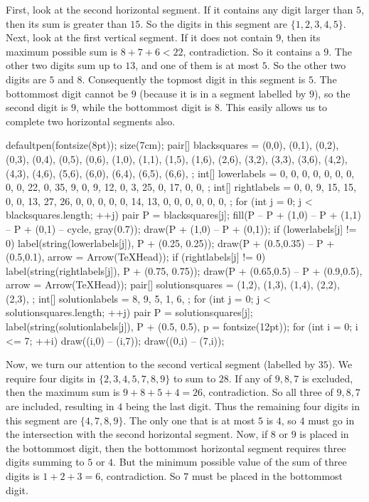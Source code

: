 First, look at the second horizontal segment. If it contains any digit larger than $5$, then its sum is greater than $15$. So the digits in this segment are $\{1,2,3,4,5\}$. Next, look at the first vertical segment. If it does not contain $9$, then its maximum possible sum is $8+7+6<22$, contradiction. So it contains a $9$. The other two digits sum up to $13$, and one of them is at most $5$. So the other two digits are $5$ and $8$. Consequently the topmost digit in this segment is $5$. The bottommost digit cannot be $9$ (because it is in a segment labelled by $9$), so the second digit is $9$, while the bottommost digit is $8$. This easily allows us to complete two horizontal segments also.
	\begin{center}
		\begin{asy}
			defaultpen(fontsize(8pt));
			size(7cm);
			pair[] blacksquares = {
				(0,0), (0,1), (0,2), (0,3), (0,4), (0,5), (0,6),
				(1,0), (1,1), (1,5), (1,6),
				(2,6),
				(3,2), (3,3), (3,6),
				(4,2), (4,3), (4,6),
				(5,6),
				(6,0), (6,4), (6,5), (6,6),
			};
			int[] lowerlabels = {
				0, 0, 0, 0, 0, 0, 0,
				0, 0, 22, 0,
				35,
				9, 0, 9,
				12, 0, 3,
				25,
				0, 17, 0, 0,
			};
			int[] rightlabels = {
				0, 0, 9, 15, 15, 0, 0,
				13, 27, 26, 0,
				0,
				0, 0, 0,
				14, 13, 0,
				0,
				0, 0, 0, 0,
			};
			for (int j = 0; j < blacksquares.length; ++j) {
				pair P = blacksquares[j];
				fill(P -- P + (1,0) -- P + (1,1) -- P + (0,1) -- cycle, gray(0.7));
				draw(P + (1,0) -- P + (0,1));
				if (lowerlabels[j] != 0) {
					label(string(lowerlabels[j]), P + (0.25, 0.25));
					draw(P + (0.5,0.35) -- P + (0.5,0.1), arrow = Arrow(TeXHead));
				}
				if (rightlabels[j] != 0) {
					label(string(rightlabels[j]), P + (0.75, 0.75));
					draw(P + (0.65,0.5) -- P + (0.9,0.5), arrow = Arrow(TeXHead));
				}
			}
			pair[] solutionsquares = {
				(1,2), (1,3), (1,4),
				(2,2), (2,3),
			};
			int[] solutionlabels = {
				8, 9, 5,
				1, 6,
			};
			for (int j = 0; j < solutionsquares.length; ++j) {
				pair P = solutionsquares[j];
				label(string(solutionlabels[j]), P + (0.5, 0.5), p = fontsize(12pt));
			}
			for (int i = 0; i <= 7; ++i) {
				draw((i,0) -- (i,7));
				draw((0,i) -- (7,i));
			}
		\end{asy}
	\end{center}
	Now, we turn our attention to the second vertical segment (labelled by $35$). We require four digits in $\{2,3,4,5,7,8,9\}$ to sum to $28$. If any of $9,8,7$ is excluded, then the maximum sum is $9+8+5+4=26$, contradiction. So all three of $9,8,7$ are included, resulting in $4$ being the last digit. Thus the remaining four digits in this segment are $\{4,7,8,9\}$. The only one that is at most $5$ is $4$, so $4$ must go in the intersection with the second horizontal segment. Now, if $8$ or $9$ is placed in the bottommost digit, then the bottommost horizontal segment requires three digits summing to $5$ or $4$. But the minimum possible value of the sum of three digits is $1+2+3=6$, contradiction. So $7$ must be placed in the bottommost digit.
